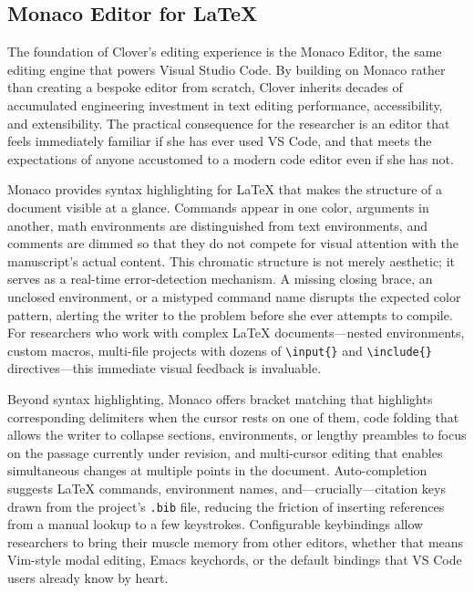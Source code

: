 \documentclass[a4paper,11pt]{article}
\begin{document}
\subsection{Monaco Editor for \LaTeX{}}

The foundation of Clover's editing experience is the Monaco Editor, the same editing engine that powers Visual Studio Code. By building on Monaco rather than creating a bespoke editor from scratch, Clover inherits decades of accumulated engineering investment in text editing performance, accessibility, and extensibility. The practical consequence for the researcher is an editor that feels immediately familiar if she has ever used VS Code, and that meets the expectations of anyone accustomed to a modern code editor even if she has not.

Monaco provides syntax highlighting for \LaTeX{} that makes the structure of a document visible at a glance. Commands appear in one color, arguments in another, math environments are distinguished from text environments, and comments are dimmed so that they do not compete for visual attention with the manuscript's actual content. This chromatic structure is not merely aesthetic; it serves as a real-time error-detection mechanism. A missing closing brace, an unclosed environment, or a mistyped command name disrupts the expected color pattern, alerting the writer to the problem before she ever attempts to compile. For researchers who work with complex \LaTeX{} documents---nested environments, custom macros, multi-file projects with dozens of \texttt{\textbackslash input\{\}} and \texttt{\textbackslash include\{\}} directives---this immediate visual feedback is invaluable.

Beyond syntax highlighting, Monaco offers bracket matching that highlights corresponding delimiters when the cursor rests on one of them, code folding that allows the writer to collapse sections, environments, or lengthy preambles to focus on the passage currently under revision, and multi-cursor editing that enables simultaneous changes at multiple points in the document. Auto-completion suggests \LaTeX{} commands, environment names, and---crucially---citation keys drawn from the project's \texttt{.bib} file, reducing the friction of inserting references from a manual lookup to a few keystrokes. Configurable keybindings allow researchers to bring their muscle memory from other editors, whether that means Vim-style modal editing, Emacs keychords, or the default bindings that VS Code users already know by heart.
\end{document}
